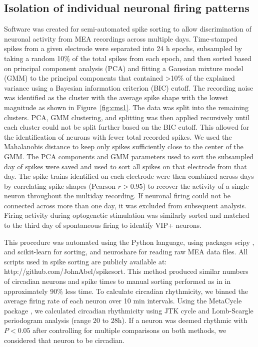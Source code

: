 \subsection*{Isolation of individual neuronal firing patterns}
Software was created for semi-automated spike sorting to allow discrimination of neuronal activity from MEA recordings across multiple days.
Time-stamped spikes from a given electrode were separated into 24 h epochs, subsampled by taking a random 10\% of the total spikes from each epoch, and then sorted based on principal component analysis (PCA) and fitting a Gaussian mixture model (GMM) to the principal components that contained >10\% of the explained variance using a Bayesian information criterion (BIC) cutoff. 
The recording noise was identified as the cluster with the average spike shape with the lowest magnitude as shown in Figure~\ref{fig:cms1}.
The data was split into the remaining clusters.
PCA, GMM clustering, and splitting was then applied recursively until each cluster could not be split further based on the BIC cutoff.
This allowed for the identification of neurons with fewer total recorded spikes.
We used the Mahalanobis distance to keep only spikes sufficiently close to the center of the GMM.
The PCA components and GMM parameters used to sort the subsampled day of spikes were saved and used to sort all spikes on that electrode from that day.
The spike trains identified on each electrode were then combined across days by correlating spike shapes (Pearson $r > 0.95$) to recover the activity of a single neuron throughout the multiday recording.
If neuronal firing could not be connected across more than one day, it was excluded from subsequent analysis.
Firing activity during optogenetic stimulation was similarly sorted and matched to the third day of spontaneous firing to identify VIP+ neurons.

This procedure was automated using the Python language, using packages scipy \cite{jones2014scipy}, and scikit-learn \cite{Pedregosa2012} for sorting, and neuroshare for reading raw MEA data files.
All scripts used in spike sorting are publicly available at: http://github.com/JohnAbel/spikesort.
This method produced similar numbers of circadian neurons and spike times to manual sorting performed as in \cite{Freeman2013a} in approximately 90\% less time.
To calculate circadian rhythmicity, we binned the average firing rate of each neuron over 10 min intervals.
Using the MetaCycle package \cite{Wu2016}, we calculated circadian rhythmicity using JTK cycle and Lomb-Scargle periodogram analysis (range 20 to 28h).
If a neuron was deemed rhythmic with $P < 0.05$ after controlling for multiple comparisons on both methods, we considered that neuron to be circadian. 

